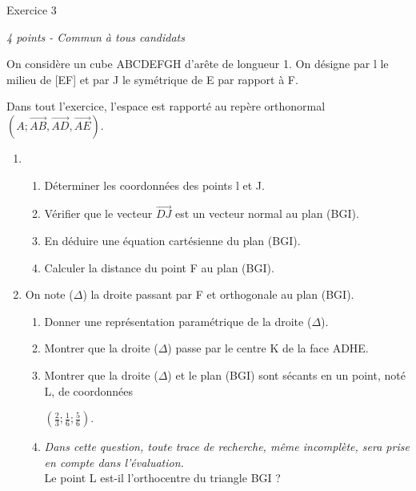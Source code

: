 
%
\begin{h2}Exercice 3\end{h2}
\textit{4 points - Commun à tous candidats }
\par
On considère un cube ABCDEFGH d'arête de longueur 1. On désigne par l le milieu de [EF] et par J le symétrique de E par rapport à F.

\begin{center}
\end{center}

Dans tout l'exercice, l'espace est rapporté au repère orthonormal $\left(A;\overrightarrow{AB},\overrightarrow{AD},\overrightarrow{AE}\right)$.
\begin{enumerate}
     \item
     \begin{enumerate}[label=\alph*.]
          \item
          Déterminer les coordonnées des points l et J.
          \item
          Vérifier que le vecteur $\overrightarrow{DJ}$ est un vecteur normal au plan (BGI).
          \item
          En déduire une équation cartésienne du plan (BGI).
          \item
          Calculer la distance du point F au plan (BGI).
     \end{enumerate}
     \item
     On note ($\Delta $) la droite passant par F et orthogonale au plan (BGI).
     \begin{enumerate}[label=\alph*.]
          \item
          Donner une représentation paramétrique de la droite ($\Delta $).
          \item
          Montrer que la droite ($\Delta $) passe par le centre K de la face ADHE.
          \item
          Montrer que la droite ($\Delta $) et le plan (BGI) sont sécants en un point, noté L, de coordonnées
          \par
          $\left(\frac{2}{3}; \frac{1}{6}; \frac{5}{6}\right)$.
          \item
          \textit{Dans cette question, toute trace de recherche, même incomplète, sera prise en compte dans l'évaluation.}
\\
          Le point L est-il l'orthocentre du triangle BGI ?
     \end{enumerate}
\end{enumerate}
